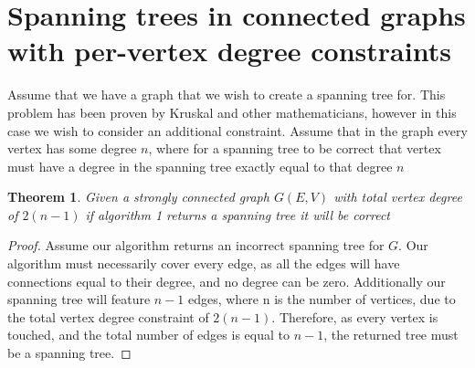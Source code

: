 \documentclass{article}
\newtheorem{theorem}{Theorem}
\begin{document}
\section{Spanning trees in connected graphs with per-vertex degree constraints}
Assume that we have a graph that we wish to create a spanning tree for. This problem has been proven by Kruskal and other
mathematicians, however in this case we wish to consider an additional constraint. Assume that in the graph every vertex has some degree $n$,
where for a spanning tree to be correct that vertex must have a degree in the spanning tree exactly equal to that degree $n$
 
\begin{theorem}
Given a strongly connected graph $G(E,V)$ with total vertex degree of $2(n-1)$ if algorithm 1 returns a spanning tree it will be correct
\end{theorem}

\begin{proof}
Assume our algorithm returns an incorrect spanning tree for $G$. Our algorithm must necessarily cover every edge, as all the edges will have connections equal to their degree, and no degree can be zero. Additionally our spanning tree will feature $n-1$ edges, where n is the number of vertices, due to the total vertex degree constraint of $2(n-1)$. Therefore, as every vertex is touched, and the total number of edges is equal to $n-1$, the returned tree must be a spanning tree.
\end{proof}
\end{document}
